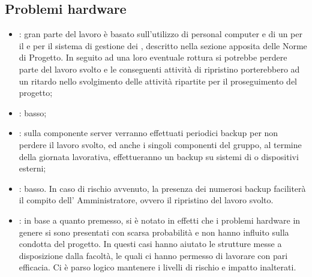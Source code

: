 \subsection{Problemi hardware}
\begin{itemize}
\item {}: gran parte del lavoro è basato sull'utilizzo di personal computer e di un  per il  e per il sistema di gestione dei , descritto nella sezione apposita delle Norme di Progetto. In seguito ad una loro eventuale rottura si potrebbe perdere parte del lavoro svolto e le conseguenti attività di ripristino porterebbero ad un ritardo nello svolgimento delle attività ripartite per il proseguimento del progetto;
\item {}: basso;
\item {}: sulla componente server verranno effettuati periodici backup per non perdere il lavoro svolto, ed anche i singoli componenti del gruppo, al termine della giornata lavorativa, effettueranno un backup su sistemi di  o dispositivi  esterni;
\item {}: basso. In caso di rischio avvenuto, la presenza dei numerosi backup faciliterà il compito dell' Amministratore, ovvero il ripristino del lavoro svolto.
\item {}: in base a quanto premesso, si è notato in effetti che i problemi hardware in genere si sono presentati con scarsa probabilità e non hanno influito sulla condotta del progetto. In questi casi hanno aiutato le strutture messe a disposizione dalla facoltà, le quali ci hanno permesso di lavorare con pari efficacia. Ci è parso logico mantenere i livelli di rischio e impatto inalterati.
\end{itemize}